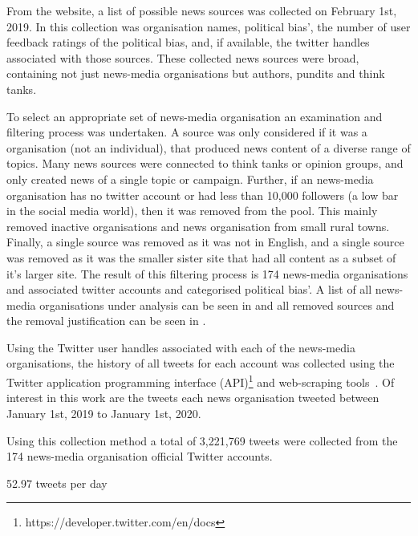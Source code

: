 
From the website, a list of possible news sources was collected on February 1st, 2019. In this collection was organisation names, political bias', the number of user feedback ratings of the political bias, and, if available, the twitter handles associated with those sources. These collected news sources were broad, containing not just news-media organisations but authors, pundits and think tanks. 

To select an appropriate set of news-media organisation an examination and filtering process was undertaken. A source was only considered if it was a organisation (not an individual), that produced news content of a diverse range of topics. Many news sources were connected to think tanks or opinion groups, and only created news of a single topic or campaign. Further, if an news-media organisation has no twitter account or had less than 10,000 followers (a low bar in the social media world), then it was removed from the pool. This mainly removed inactive organisations and news organisation from small rural towns. Finally, a single source was removed as it was not in English, and a single source was removed as it was the smaller sister site that had all content as a subset of it's larger site.  The result of this filtering process is 174 news-media organisations and associated twitter accounts and categorised political bias'.  A list of all news-media organisations under analysis can be seen in \cite{app:accounts} and all removed sources and the removal justification can be seen in .

Using the Twitter user handles associated with each of the news-media organisations, the history of all tweets for each account was collected using the Twitter application programming interface (API)\footnote{https://developer.twitter.com/en/docs} and web-scraping tools~. Of interest in this work are the tweets each news organisation tweeted between January 1st, 2019 to January 1st, 2020. 

Using this collection method a total of 3,221,769 tweets were collected from the 174 news-media organisation official Twitter accounts. 

52.97 tweets per day





